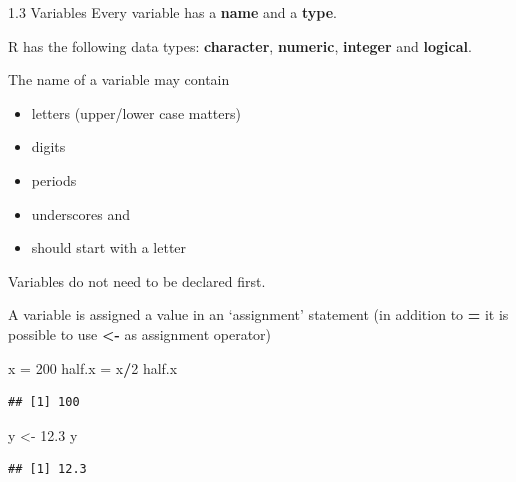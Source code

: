 \documentclass[
  ignorenonframetext,
]{beamer}
\newenvironment{Shaded}{\begin{snugshade}}{\end{snugshade}}
\newcommand{\DecValTok}[1]{\textcolor[rgb]{0.00,0.00,0.81}{#1}}
\newcommand{\FloatTok}[1]{\textcolor[rgb]{0.00,0.00,0.81}{#1}}
\newcommand{\NormalTok}[1]{#1}
\newcommand{\OtherTok}[1]{\textcolor[rgb]{0.56,0.35,0.01}{#1}}
\newcommand{\SpecialCharTok}[1]{\textcolor[rgb]{0.81,0.36,0.00}{\textbf{#1}}}
\providecommand{\tightlist}{%
  \setlength{\itemsep}{0pt}\setlength{\parskip}{0pt}}
\begin{document}
\begin{frame}{1.3 Variables}
\protect\hypertarget{variables}{}
Every variable has a \textbf{name} and a \textbf{type}.

R has the following data types: \textbf{character}, \textbf{numeric},
\textbf{integer} and \textbf{logical}.

The name of a variable may contain

\begin{itemize}
\tightlist
\item
  letters (upper/lower case matters)
\item
  digits
\item
  periods
\item
  underscores and
\item
  should start with a letter
\end{itemize}
\end{frame}

\begin{frame}[fragile]
Variables do not need to be declared first.

A variable is assigned a value in an `assignment' statement (in addition
to \textbf{=} it is possible to use \textbf{\textless-} as assignment
operator)

\begin{Shaded}
\begin{Highlighting}[]
\NormalTok{x }\OtherTok{=} \DecValTok{200}
\NormalTok{half.x  }\OtherTok{=}\NormalTok{  x}\SpecialCharTok{/}\DecValTok{2}
\NormalTok{half.x}
\end{Highlighting}
\end{Shaded}

\begin{verbatim}
## [1] 100
\end{verbatim}

\begin{Shaded}
\begin{Highlighting}[]
\NormalTok{y }\OtherTok{\textless{}{-}} \FloatTok{12.3}
\NormalTok{y }
\end{Highlighting}
\end{Shaded}

\begin{verbatim}
## [1] 12.3
\end{verbatim}
\end{frame}
\end{document}
